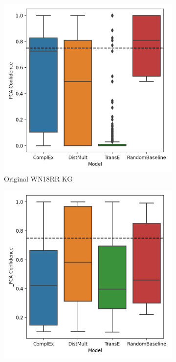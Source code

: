 \begin{figure}[htbp]
\centering
\begin{subfigure}{.5\textwidth}
  \centering
  \includegraphics[width=1\linewidth]{figures/results/PCA_models/PCA-models_wn18rr.png}
  \caption{Original WN18RR KG}
  \label{fig:PCA-models_wn18rr_boxplot_sub}
\end{subfigure}%
\begin{subfigure}{.5\textwidth}
  \centering
  \includegraphics[width=1\linewidth]{figures/results/PCA_models/_PCA-models_wn18rr.png}

\end{subfigure}
\end{figure}
